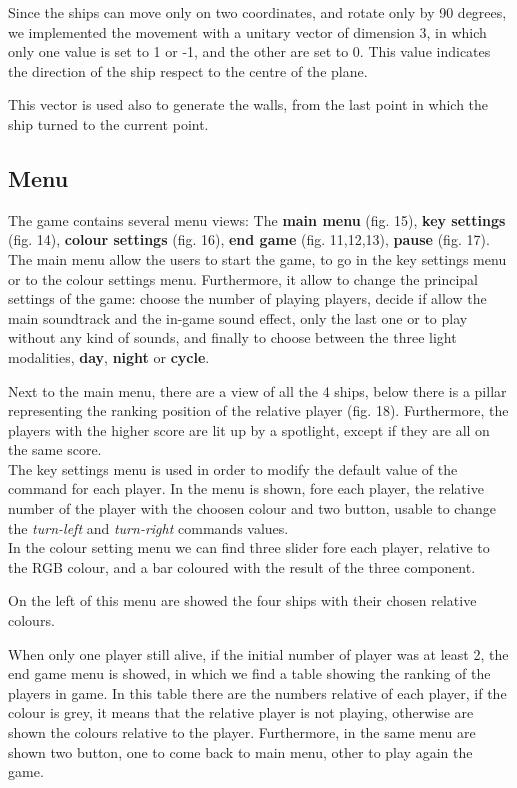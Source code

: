 \documentclass[11pt]{article}
\begin{document}
Since the ships can move only on two coordinates, and rotate  only by 90 degrees, we implemented the movement with a unitary vector of dimension 3, in which only one value is set to 1 or -1, and the other are set to 0. This value indicates the direction of the ship respect to the centre of the plane. 

This vector is used also to generate the walls, from the last point in which the ship turned to the current point.
\subsection{Menu}
\FloatBarrier


	The game contains several menu views: The \textbf{main menu} (fig. 15), \textbf{key settings} (fig. 14), \textbf{colour settings} (fig. 16), \textbf{end game} (fig. 11,12,13), \textbf{pause} (fig. 17).\\
	
	The main menu allow the users to start the game, to go in the key settings menu or to the colour settings menu.
	Furthermore, it allow to change the principal settings of the game: choose the number of playing players, decide if allow the main soundtrack and the in-game sound effect, only the last one or to play without any kind of sounds, and finally to choose between the three light modalities, \textbf{day}, \textbf{night} or \textbf{cycle}.
	
	Next to the main menu, there are a view of all the 4 ships, below there is a pillar representing the ranking position of the relative player (fig. 18).
	Furthermore, the players with the higher score are lit up by a spotlight, except if they are all on the same score.\\
	
	The key settings menu is used in order to modify the default value of the command for each player. In the menu is shown, fore each player, the relative number of the player with the choosen colour and two button, usable to change the \textit{turn-left} and \textit{turn-right} commands values.\\
	
	In the colour setting menu we can find three slider fore each player, relative to the RGB colour, and a bar coloured with the result of the three component.
	
	On the left of this menu are showed the four ships with their chosen relative colours.
	
	When only one player still alive, if the initial number of player was at least 2, the end game menu is showed, in which we find a table showing the ranking of the players in game. In this table there are the numbers relative of each player, if the colour is grey, it means that the relative player is not playing, otherwise are shown the colours relative to the player.
	Furthermore, in the same menu are shown two button, one to come back to main menu, other to play again the game.\\
	
\end{document}
